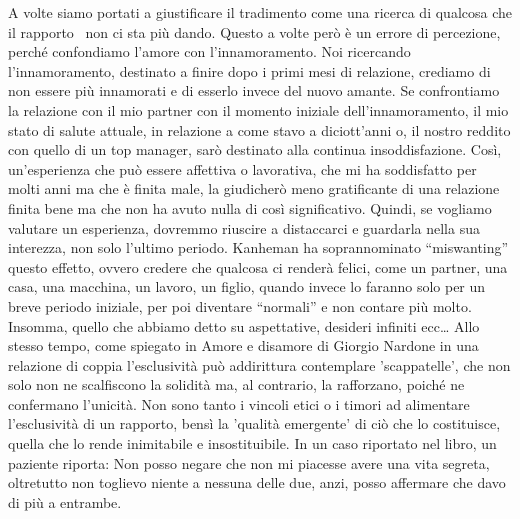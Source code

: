 \documentclass[12pt]{book} %
\begin{document}
A volte siamo portati a giustificare il tradimento come una ricerca di qualcosa che il rapporto \ non ci sta più dando.
Questo a volte però è un errore di percezione, perché confondiamo l'amore con
l'innamoramento. Noi ricercando l'innamoramento, destinato a finire dopo i
primi mesi di relazione, crediamo di non essere più innamorati e di esserlo invece del nuovo amante. Se confrontiamo la
relazione con il mio partner con il momento iniziale dell'innamoramento, il mio stato di salute
attuale, in relazione a come stavo a diciott'anni o, il nostro reddito con quello di un top
manager, sarò destinato alla continua insoddisfazione. Così, un'esperienza che può essere
affettiva o lavorativa, che mi ha soddisfatto per molti anni ma che è finita male, la giudicherò meno gratificante di
una relazione finita bene ma che non ha avuto nulla di così significativo. Quindi, se vogliamo valutare un esperienza,
dovremmo riuscire a distaccarci e guardarla nella sua interezza, non solo l'ultimo periodo.
Kanheman ha soprannominato “miswanting” questo effetto, ovvero credere che qualcosa ci renderà felici, come un partner,
una casa, una macchina, un lavoro, un figlio, quando invece lo faranno solo per un breve periodo iniziale, per poi
diventare “normali” e non contare più molto. Insomma, quello che abbiamo detto su aspettative, desideri infiniti ecc…
Allo stesso tempo, come spiegato in Amore e disamore di Giorgio Nardone
in una relazione di coppia l'esclusività può addirittura contemplare
'scappatelle', che non solo non ne scalfiscono la solidità ma, al contrario,
la rafforzano, poiché ne confermano l'unicità.\newline
Non sono tanto i vincoli etici o i timori ad alimentare l'esclusività di un rapporto, bensì la
'qualità emergente' di ciò che lo costituisce, quella che lo rende
inimitabile e insostituibile. In un caso riportato nel libro, un paziente riporta: Non posso negare che non mi piacesse
avere una vita segreta, oltretutto non toglievo niente a nessuna delle due, anzi, posso affermare che davo di più a
entrambe.
\end{document}
